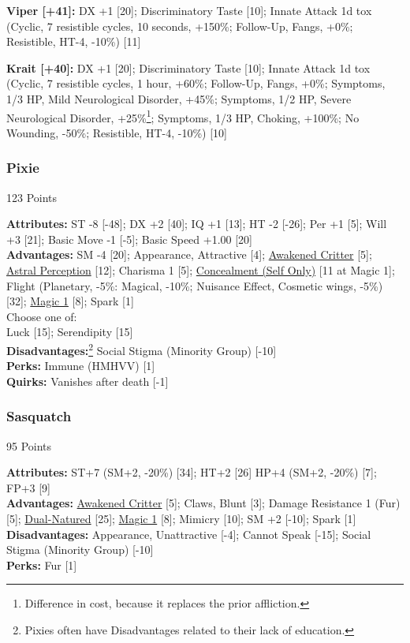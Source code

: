 \begin{multicols*}{3}
	\textbf{Viper [+41]:} DX +1 [20]; Discriminatory Taste [10]; Innate Attack 1d tox (Cyclic, 7 resistible cycles, 10 seconds, +150\%; Follow-Up, Fangs, +0\%; Resistible, HT-4, -10\%) [11]
	
	\textbf{Krait [+40]:} DX +1 [20]; Discriminatory Taste [10]; Innate Attack 1d tox (Cyclic, 7 resistible cycles, 1 hour, +60\%; Follow-Up, Fangs, +0\%; Symptoms, 1/3 HP, Mild Neurological Disorder, +45\%; Symptoms, 1/2 HP, Severe Neurological Disorder, +25\%\footnote{Difference in cost, because it replaces the prior affliction.}; Symptoms, 1/3 HP, Choking, +100\%; No Wounding, -50\%; Resistible, HT-4, -10\%) [10]
	
	\subsubsection*{Pixie}
	\begin{flushright}
		123 Points
	\end{flushright}
	\textbf{Attributes:} 
	ST -8 [-48]; DX +2 [40]; IQ +1 [13]; HT -2 [-26]; Per +1 [5]; Will +3 [21]; Basic Move -1 [-5]; Basic Speed +1.00 [20]
	\\\textbf{Advantages:} 
	SM -4 [20]; Appearance, Attractive [4]; \hyperref[awakened_critter]{Awakened Critter} [5]; \hyperref[astral_perception]{Astral Perception} [12]; Charisma 1 [5]; \hyperref[concealment_self_only]{Concealment (Self Only)} [11 at Magic 1]; Flight (Planetary, -5\%: Magical, -10\%; Nuisance Effect,  Cosmetic wings, -5\%) [32]; \hyperref[magic]{Magic 1} [8]; Spark [1]
	\\ Choose one of: \\
	Luck [15]; Serendipity [15]
	\\\textbf{Disadvantages:}\footnote{Pixies often have Disadvantages related to their lack of education.}
	Social Stigma (Minority Group) [-10]
	\\\textbf{Perks:}
	Immune (HMHVV) [1]
	\\\textbf{Quirks:}
	Vanishes after death [-1]
	
	\subsubsection*{Sasquatch}
	\begin{flushright}
		95 Points
	\end{flushright}
	\textbf{Attributes:} 
	ST+7 (SM+2, -20\%) [34]; HT+2 [26] HP+4 (SM+2, -20\%) [7]; FP+3 [9]
	\\\textbf{Advantages:} 
	\hyperref[awakened_critter]{Awakened Critter} [5]; Claws, Blunt [3]; Damage Resistance 1 (Fur) [5];  \hyperref[dual_natured]{Dual-Natured} [25]; \hyperref[magic]{Magic 1} [8]; Mimicry [10]; SM +2 [-10]; Spark [1]
	\\\textbf{Disadvantages:} 
	Appearance, Unattractive [-4]; Cannot Speak [-15]; Social Stigma (Minority Group) [-10]
	\\\textbf{Perks:}
	Fur [1]
	

\end{multicols*}
